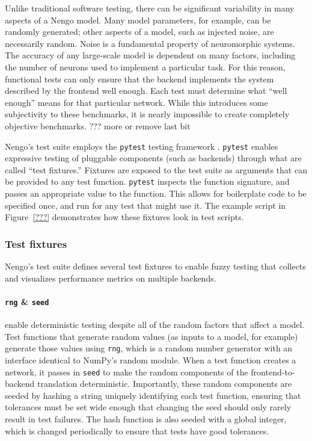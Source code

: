 \documentclass{frontiersSCNS}
\begin{document}
Unlike traditional software testing,
there can be significant variability
in many aspects of a Nengo model.
Many model parameters, for example,
can be randomly generated;
other aspects of a model,
such as injected noise,
are necessarily random.
Noise is a fundamental property
of neuromorphic systems.
The accuracy of any large-scale model
is dependent on many factors,
including the number of neurons used
to implement a particular task.
For this reason,
functional tests can only
ensure that the backend implements
the system described by the frontend
well enough.
Each test must determine what
``well enough'' means for that particular network.
While this introduces some subjectivity
to these benchmarks,
it is nearly impossible to create
completely objective benchmarks.
??? more or remove last bit

Nengo's test suite employs the \texttt{pytest}
testing framework \cite{???}.
\texttt{pytest} enables
expressive testing of pluggable components
(such as backends)
through what are called ``test fixtures.''
Fixtures are exposed to the test suite
as arguments that can be provided
to any test function.
\texttt{pytest} inspects the function signature,
and passes an appropriate value
to the function.
This allows for boilerplate code
to be specified once,
and run for any test that might use it.
The example script in Figure~\ref{???}
demonstrates how these fixtures
look in test scripts.

\subsubsection{Test fixtures}

Nengo's test suite defines several test fixtures
to enable fuzzy testing
that collects and visualizes performance metrics
on multiple backends.

\paragraph{\texttt{rng} \& \texttt{seed}}
enable deterministic testing despite
all of the random factors that affect a model.
Test functions that generate random values
(as inputs to a model, for example)
generate those values using \texttt{rng},
which is a random number generator
with an interface identical to
NumPy's random module.
When a test function creates a network,
it passes in \texttt{seed} to make
the random components
of the frontend-to-backend translation deterministic.
Importantly, these random components
are seeded by hashing a string uniquely
identifying each test function,
ensuring that tolerances must be set
wide enough that changing the seed
should only rarely result in test failures.
The hash function is also seeded
with a global integer,
which is changed periodically to ensure
that tests have good tolerances.
\end{document}
